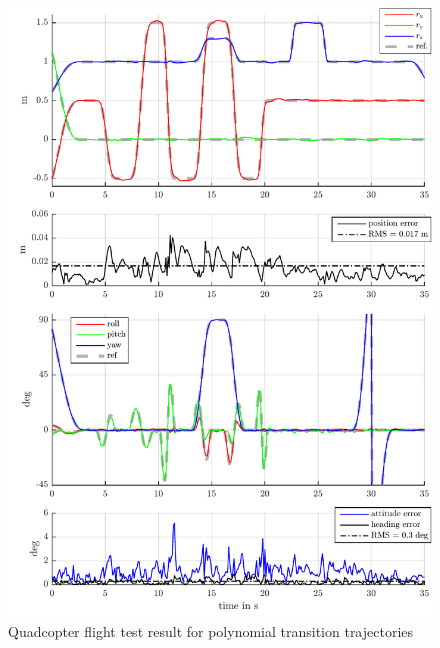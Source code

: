 \begin{figure}
 \centering
 \includegraphics{graphics/QuadFlightTest/QuadManeuver42Result}
 \caption{Quadcopter flight test result for polynomial transition trajectories}
 \label{fig:QuadManeuver42Result}
\end{figure}

